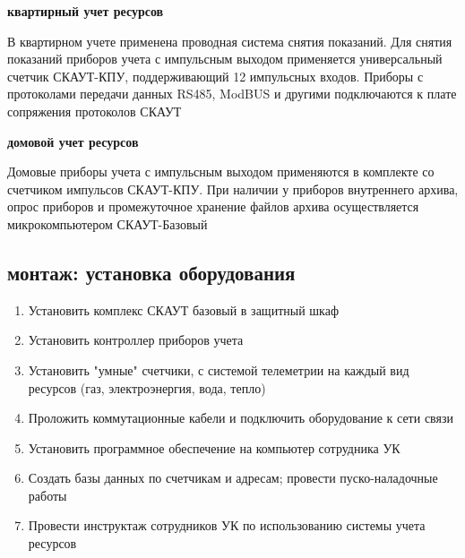 \textbf{квартирный учет ресурсов}
 
 В квартирном учете применена проводная система снятия показаний. Для снятия показаний приборов учета с импульсным выходом применяется универсальный счетчик СКАУТ-КПУ, поддерживающий 12 импульсных входов. Приборы с протоколами передачи данных RS485, ModBUS и другими подключаются к плате сопряжения протоколов СКАУТ

\textbf{домовой учет ресурсов}

Домовые приборы учета с импульсным выходом применяются в комплекте со счетчиком импульсов СКАУТ-КПУ. При наличии у приборов внутреннего архива, опрос приборов и промежуточное хранение файлов архива осуществляется микрокомпьютером СКАУТ-Базовый

\subsection{монтаж: установка оборудования}

\begin{enumerate}
	\item Установить комплекс СКАУТ базовый в защитный шкаф
	\item Установить контроллер приборов учета
	\item Установить "умные" счетчики, с системой телеметрии на каждый вид ресурсов (газ, электроэнергия, вода, тепло)
	\item Проложить коммутационные кабели и подключить оборудование к сети связи
	\item Установить программное обеспечение на компьютер сотрудника УК
	\item Создать базы данных по счетчикам и адресам; провести пуско-наладочные работы
	\item Провести инструктаж сотрудников УК по использованию системы учета ресурсов
\end{enumerate}